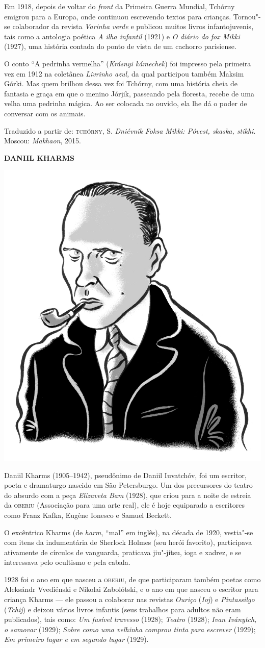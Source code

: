 Em 1918, depois de voltar do \emph{front} da Primeira Guerra Mundial,
Tchórny emigrou para a Europa, onde continuou escrevendo textos para
crianças. Tornou"-se colaborador da revista \emph{Varinha verde} e
publicou muitos livros infantojuvenis, tais como a antologia poética
\emph{A ilha infantil} (1921) e \emph{O diário do fox Mikki}
(1927), uma história contada do ponto de vista de um cachorro
parisiense.

O conto ``A pedrinha vermelha'' (\emph{Krásnyi kámechek}) foi impresso
pela primeira vez em 1912 na coletânea \emph{Livrinho azul,} da qual
participou também Maksim Górki. Mas quem brilhou dessa vez foi Tchórny,
com uma história cheia de fantasia e graça em que o menino Jórjik,
passeando pela floresta, recebe de uma velha uma pedrinha mágica. Ao
ser colocada no ouvido, ela lhe dá o poder de conversar com os animais.

Traduzido a partir de:
\textsc{tchórny}, S. \emph{Dniévnik Foksa Mikki: Póvest, skaska, stikhi}. Moscou:
\emph{Makhaon}, 2015.

\bigskip
\noindent\textbf{DANIIL KHARMS}\medskip

\noindent\includegraphics[width=.8in]{./imgs/autor12.jpg}

\noindent{}Daniil Kharms (1905--1942), pseudônimo de Daniil Iuvatchóv, foi um
escritor, poeta e dramaturgo nascido em São Petersburgo. Um dos
precursores do teatro do absurdo com a peça \emph{Elizaveta Bam} (1928),
que criou para a noite de estreia da \textsc{oberiu} (Associação para uma arte
real), ele é hoje equiparado a escritores como Franz Kafka, Eugène
Ionesco e Samuel Beckett.

O excêntrico Kharms (de \emph{harm}, ``mal'' em inglês), na década de
1920, vestia"-se com itens da indumentária de Sherlock Holmes (seu herói
favorito), participava ativamente de círculos de vanguarda, praticava
jiu"-jítsu, ioga e xadrez, e se interessava pelo ocultismo e pela cabala.

1928 foi o ano em que nasceu a \textsc{oberiu}, de que participaram também poetas
como Aleksándr Vvediénski e Nikolai Zabolótski, e o ano em que nasceu o
escritor para criança Kharms --- ele passou a colaborar nas revistas
\emph{Ouriço} (\emph{Ioj}) e \emph{Pintassilgo} (\emph{Tchij}) e deixou
vários livros infantis (seus trabalhos para adultos não eram
publicados), tais como: \emph{Um fusível travesso} (1928); \emph{Teatro}
(1928); \emph{Ivan Iványtch, o samovar} (1929); \emph{Sobre como uma
velhinha comprou tinta para escrever} (1929); \emph{Em primeiro lugar e
em segundo lugar} (1929).

